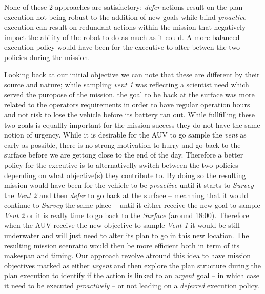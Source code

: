 None of these 2 approaches are satisfactory; {\em defer} actions
result on the plan execution not being robust to the addition of new
goals while blind {\em proactive} execution can result on redundant
actions within the mission that negatively impact the ability of the
robot to do as much as it could. A more balanced execution policy
would have been for the executive to alter betwen the two policies
during the mission. 

Looking back at our initial objective we can note that these are
different by their source and nature; while 
sampling {\em vent 1} was reflecting a scientist need which served the
puropose of the mission, the goal to be back at the surface was more
related to the operators requirements in order to have regular
operation hours and not risk to lose the vehicle before its battery
ran out. While fullfilling these two goals is equallly important for
the mission success they do not have the same notion of urgency. While
it is desirable  for the AUV to go sample the {\em vent} as early as
possible, there is no strong motivation to hurry and go back to the
surface before we are gettong close to the end of the day. Therefore a
better policy for the executive is to alternativelly switch between
the two policies depending on what objective(s) they contribute to. By
doing so the resulting mission would have been for the vehicle to be
{\em proactive} until it starts to {\em Survey} the {\em Vent 2} and
then {\em defer} to go back at the surface -- meanning that it would
continue to {\em Survey} the same place -- until it either receive the
new goal to sample {\em Vent 2} or it is really time to go back to the
{\em Surface} (around 18:00). Therefore when the AUV receive the new
objective to sample {\em Vent 1} it would be still underwater and will
just need to alter its plan to go in this new location. The resulting
mission scenratio would then be more efficient both in term of its
makespan and timing. Our approach revolve atround this idea to have
mission objectives marked as either {\em urgent} and then explore the
plan structure during the plan execution to identify if the action is
linked to an {\em urgent} goal -- in which case it need to be executed
{\em proactively} -- or not leading on a {\em deferred} execution policy.
 


